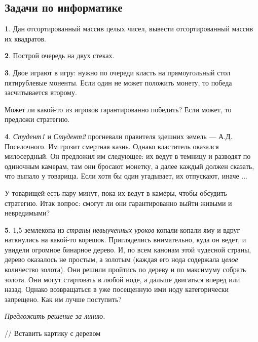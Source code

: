 \documentclass[14pt, a4paper]{extarticle}
\theoremstyle{definition}
\newtheorem{problem}{}
\theoremstyle{definition}
\theoremstyle{remark}
\numberwithin{equation}{section}
\begin{document}
\subsection*{Задачи по информатике}

\begin{problem}
    Дан отсортированный массив целых чисел, вывести 
    отсортированный массив их квадратов.
\end{problem}

\begin{problem}
    Построй очередь на двух стеках.
\end{problem}

\begin{problem}
    Двое играют в игру: нужно по очереди класть на прямоугольный
    стол пятирублевые моненты. Если один не может положить 
    монету, то победа засчитывается второму.

    Может ли какой-то из игроков гарантированно победить? Если может,
    то предложи стратегию.
\end{problem}

\begin{problem}
    \textit{Студент1} и \textit{Студент2} прогневали правителя
    здешних земель --- А.Д. Поселочного. Им грозит смертная казнь.
    Однако властитель оказался милосердный. Он предложил
    им следующее: их ведут в темницу и разводят по одиночным камерам,
    там они бросают монетку, а далее каждый должен сказать,
    что выпало у товарища. Если хотя бы один угадывает, их отпускают, 
    иначе ...

    У товарищей есть пару минут, пока их ведут в камеры, чтобы 
    обсудить стратегию. Итак вопрос: смогут ли они гарантированно выйти
    живыми и невредимыми?
\end{problem}

\begin{problem}
    1,5 землекопа из \textit{страны невыученных уроков} копали-копали яму
    и вдруг наткнулись на какой-то корешок. Пригляделись внимательно,
    куда он ведет, и увидели огромное бинарное дерево. И, по всем канонам
    этой чудесной страны, дерево оказалось не простым, а золотым 
    (каждая его нода
    содержала \textit{целое} количество золота). Они решили пройтись 
    по дереву и по максимуму собрать золота. Они могут
    стартовать в любой ноде, а дальше двигаться вперед или назад. 
    Однако возвращаться в уже посещенную ими ноду категорически 
    запрещено. Как им лучше поступить?

    \textit{Предложить решение за линию.}

    // Вставить картику с деревом
\end{problem}
\end{document}
